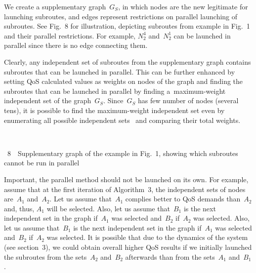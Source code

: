 \begin{multicols}{2}
We create a supplementary graph~$G_S$, in which nodes are the new legitimate 
for launching subroutes, and edges represent restrictions on parallel 
launching of subroutes. See Fig.~8 for illustration, 
depicting subroutes from example in Fig.~1 and their parallel 
restrictions. For example, $N^4_2$ and~$N^1_2$ can be launched in parallel since 
there is no edge connecting them.

Clearly, any independent set of subroutes from the supplementary 
graph contains subroutes that can be launched in parallel. 
This can be further enhanced by setting QoS calculated values as weights 
on nodes of the graph and finding the subroutes that can be launched 
in parallel by finding a~maximum-weight independent set of the graph~$G_S$. 
Since~$G_S$ has few
 number of nodes (several tens), it is possible to find 
the
 maximum-weight independent set even by enumerating
 all possible independent 
sets~\cite{wu_review_2015} and comparing their total weights.
{



{ \begin{center}  %
\vspace*{12pt}
  \mbox{%
 \epsfxsize=36.666mm 
 }


\end{center}


\noindent
{{\figurename~8}\ \ \small{Supplementary graph of the example in 
 Fig.~1, showing which subroutes cannot be run in parallel}
}}




} 



Important, the parallel method should not be launched on its own. 
For example, assume that at the first iteration of Algorithm~3, 
the independent sets of nodes are~$A_1$ and~$A_2$. Let us assume that~$A_1$ complies 
better to QoS demands than~$A_2$ and, thus, $A_1$ will be selected. 
Also, let us assume that~$B_1$ is the next independent set in the graph 
if~$A_1$ was selected and~$B_2$ if~$A_2$ was selected. 
Also, let us assume that~$B_1$ is
the next independent set in the graph if~$A_1$ was selected and~$B_2$ if~$A_2$ 
was selected.
It is possible that due to the dynamics of the system (see section~3), 
we could obtain overall higher QoS results if we initially launched the 
subroutes from the sets~$A_2$ and~$B_2$ afterwards than from the sets~$A_1$ and~$B_1$.
 


\end{multicols}
